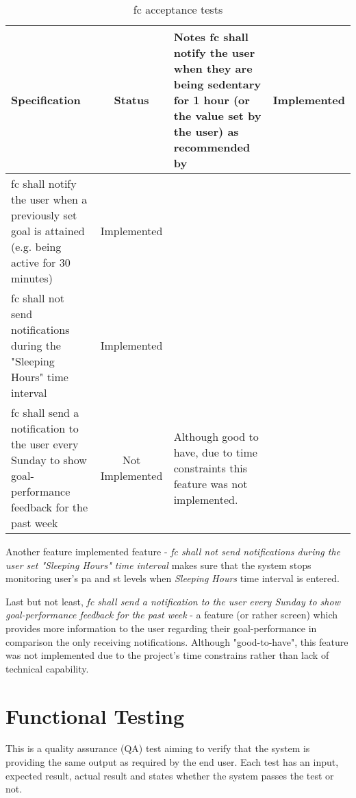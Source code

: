 \begin{table}[ht]
    \centering
    \tabulinesep=1.5mm
  \begin{longtabu} to \textwidth {|X|c|X|}
    \hline
      \textbf{Specification}
      & \textbf{Status}
      & \textbf{Notes}
    \endhead \hline
    \gls{fc} shall notify the user when they are being sedentary for 1 hour (or the value set by the user) as recommended by \citet[]{swartz2011}
    & Implemented
    & 
    \\ \hline
    \gls{fc} shall notify the user when a previously set goal is attained (e.g. being active for 30 minutes)
    & Implemented
    & 
    \\ \hline
    \gls{fc} shall not send notifications during the "Sleeping Hours" time interval
    & Implemented
    & 
    \\ \hline
    \gls{fc} shall send a notification to the user every Sunday to show goal-performance feedback for the past week
    & Not Implemented
    & Although good to have, due to time constraints this feature was not implemented.
    \\ \hline
 \end{longtabu}
    \caption{\gls{fc} acceptance tests}
    \label{tab:fc-acceptance-tests}
\end{table}

Another feature implemented feature - \textit{\gls{fc} shall not send notifications during the user set "Sleeping Hours" time interval} makes sure that the system stops monitoring user's \gls{pa} and \gls{st} levels when \textit{Sleeping Hours} time interval is entered. 

Last but not least, \textit{\gls{fc} shall send a notification to the user every Sunday to show goal-performance feedback for the past week} - a feature (or rather screen) which provides more information to the user regarding their goal-performance in comparison the only receiving notifications. Although "good-to-have", this feature was not implemented due to the project's time constrains rather than lack of technical capability.

\section{Functional Testing}
This is a quality assurance (QA) test aiming to verify that the system is providing the same output as required by the end user. Each test has an input, expected result, actual result and states whether the system passes the test or not.

